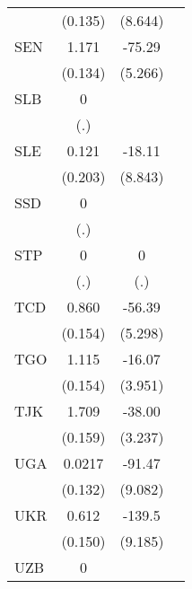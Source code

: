 \begin{table}[htbp]
\begin{tabular}{l*{3}{c}}
                &  (0.135)         &  (8.644)         &                  \\
\addlinespace
SEN             &    1.171\sym{***}&   -75.29\sym{***}&                  \\
                &  (0.134)         &  (5.266)         &                  \\
\addlinespace
SLB             &        0         &                  &                  \\
                &      (.)         &                  &                  \\
\addlinespace
SLE             &    0.121         &   -18.11\sym{*}  &                  \\
                &  (0.203)         &  (8.843)         &                  \\
\addlinespace
SSD             &        0         &                  &                  \\
                &      (.)         &                  &                  \\
\addlinespace
STP             &        0         &        0         &                  \\
                &      (.)         &      (.)         &                  \\
\addlinespace
TCD             &    0.860\sym{***}&   -56.39\sym{***}&                  \\
                &  (0.154)         &  (5.298)         &                  \\
\addlinespace
TGO             &    1.115\sym{***}&   -16.07\sym{***}&                  \\
                &  (0.154)         &  (3.951)         &                  \\
\addlinespace
TJK             &    1.709\sym{***}&   -38.00\sym{***}&                  \\
                &  (0.159)         &  (3.237)         &                  \\
\addlinespace
UGA             &   0.0217         &   -91.47\sym{***}&                  \\
                &  (0.132)         &  (9.082)         &                  \\
\addlinespace
UKR             &    0.612\sym{***}&   -139.5\sym{***}&                  \\
                &  (0.150)         &  (9.185)         &                  \\
\addlinespace
UZB             &        0         &                  &                  \\

\end{tabular}
\end{table}
